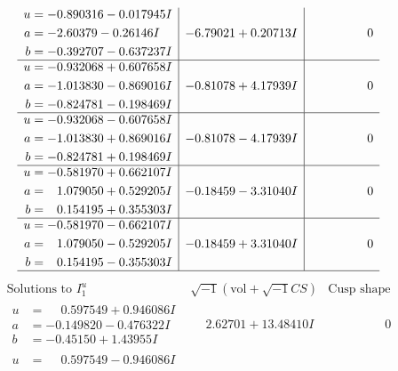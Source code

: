 \documentclass[1p]{elsarticle_modified}
\theoremstyle{definition}
\newcommand{\I}{\sqrt{-1}}
\begin{document}
$$\begin{array}{c|c|c}
\begin{aligned}
u &= -0.890316 - 0.017945 I \\
a &= -2.60379 - 0.26146 I \\
b &= -0.392707 - 0.637237 I\end{aligned}
 & -6.79021 + 0.20713 I & \phantom{-0.000000 } 0 \\ \hline\begin{aligned}
u &= -0.932068 + 0.607658 I \\
a &= -1.013830 - 0.869016 I \\
b &= -0.824781 - 0.198469 I\end{aligned}
 & -0.81078 + 4.17939 I & \phantom{-0.000000 } 0 \\ \hline\begin{aligned}
u &= -0.932068 - 0.607658 I \\
a &= -1.013830 + 0.869016 I \\
b &= -0.824781 + 0.198469 I\end{aligned}
 & -0.81078 - 4.17939 I & \phantom{-0.000000 } 0 \\ \hline\begin{aligned}
u &= -0.581970 + 0.662107 I \\
a &= \phantom{-}1.079050 + 0.529205 I \\
b &= \phantom{-}0.154195 + 0.355303 I\end{aligned}
 & -0.18459 - 3.31040 I & \phantom{-0.000000 } 0 \\ \hline\begin{aligned}
u &= -0.581970 - 0.662107 I \\
a &= \phantom{-}1.079050 - 0.529205 I \\
b &= \phantom{-}0.154195 - 0.355303 I\end{aligned}
 & -0.18459 + 3.31040 I & \phantom{-0.000000 } 0\\
 \hline 
 \end{array}$$\newpage$$\begin{array}{c|c|c}  
\text{Solutions to }I^u_{1}& \I (\text{vol} + \sqrt{-1}CS) & \text{Cusp shape}\\
 \hline 
\begin{aligned}
u &= \phantom{-}0.597549 + 0.946086 I \\
a &= -0.149820 - 0.476322 I \\
b &= -0.45150 + 1.43955 I\end{aligned}
 & \phantom{-}2.62701 + 13.48410 I & \phantom{-0.000000 } 0 \\ \hline\begin{aligned}
u &= \phantom{-}0.597549 - 0.946086 I \\

\end{aligned}
\end{array}$$
\end{document}
